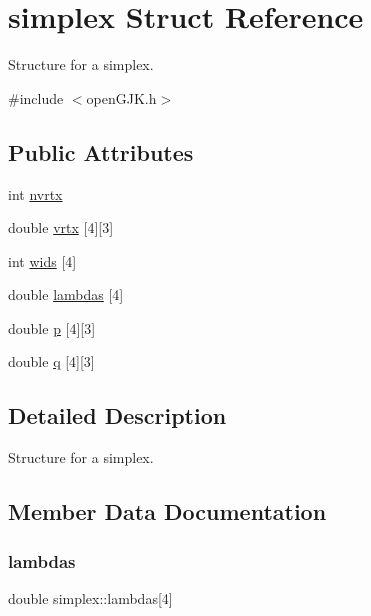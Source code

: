 \hypertarget{structsimplex}{}\section{simplex Struct Reference}
\label{structsimplex}


Structure for a simplex.  




{\ttfamily \#include $<$open\+G\+J\+K.\+h$>$}

\subsection*{Public Attributes}
\begin{DoxyCompactItemize}
\item 
int \hyperlink{structsimplex_aa906f22fbbb2294125763acaefc1dbca}{nvrtx}
\item 
double \hyperlink{structsimplex_a8d5910f99cfc91911760b293a23bdf7c}{vrtx} \mbox{[}4\mbox{]}\mbox{[}3\mbox{]}
\item 
int \hyperlink{structsimplex_a803e0af74fc3038ff163c4a660bb7934}{wids} \mbox{[}4\mbox{]}
\item 
double \hyperlink{structsimplex_ad4d143ab91e8f8de53e97072787baf6e}{lambdas} \mbox{[}4\mbox{]}
\item 
double \hyperlink{structsimplex_a9784d399d1d417f3545c1bdc961bfac8}{p} \mbox{[}4\mbox{]}\mbox{[}3\mbox{]}
\item 
double \hyperlink{structsimplex_a68c12347e53a0203a32b05cae1b18134}{q} \mbox{[}4\mbox{]}\mbox{[}3\mbox{]}
\end{DoxyCompactItemize}


\subsection{Detailed Description}
Structure for a simplex. 

\subsection{Member Data Documentation}
\mbox{\label{structsimplex_ad4d143ab91e8f8de53e97072787baf6e}} 
\subsubsection{\texorpdfstring{lambdas}{lambdas}}
{\footnotesize\ttfamily double simplex\+::lambdas\mbox{[}4\mbox{]}}

